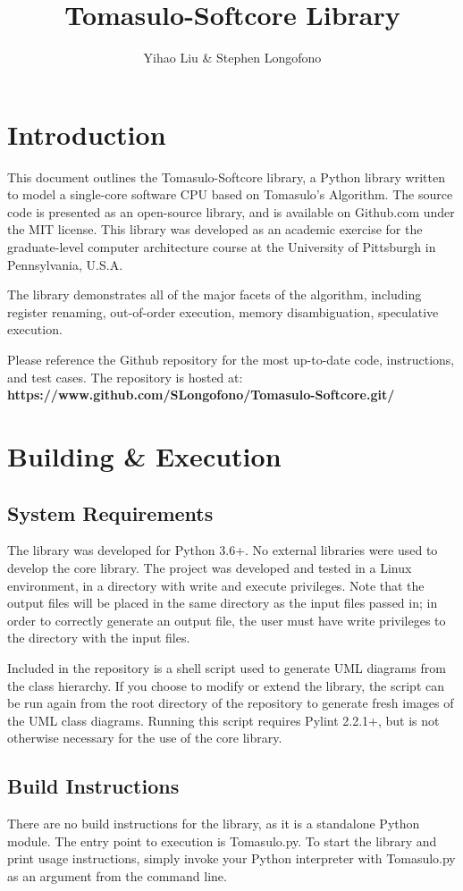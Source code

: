 \documentclass[12pt]{article}
\title{Tomasulo-Softcore Library}
\author{Yihao Liu \& Stephen Longofono}
\begin{document}
\maketitle
\section*{Introduction}
This document outlines the Tomasulo-Softcore library, a Python library written to model a single-core software CPU based on Tomasulo's Algorithm.  The source code is presented as an open-source library, and is available on Github.com under the MIT license.  This library was developed as an academic exercise for the graduate-level computer architecture course at the University of Pittsburgh in Pennsylvania, U.S.A.

The library demonstrates all of the major facets of the algorithm, including register renaming, out-of-order execution, memory disambiguation, speculative execution.

Please reference the Github repository for the most up-to-date code, instructions, and test cases.  The repository is hosted at: \\
\textbf{https://www.github.com/SLongofono/Tomasulo-Softcore.git/}

\section{Building \& Execution}
\subsection{System Requirements}
The library was developed for Python 3.6+.  No external libraries were used to develop the core library.  The project was developed and tested in a Linux environment, in a directory with write and execute privileges.  Note that the output files will be placed in the same directory as the input files passed in; in order to correctly generate an output file, the user must have write privileges to the directory with the input files.

Included in the repository is a shell script used to generate UML diagrams from the class hierarchy.  If you choose to modify or extend the library, the script can be run again from the root directory of the repository to generate fresh images of the UML class diagrams.  Running this script requires Pylint 2.2.1+, but is not otherwise necessary for the use of the core library.

\subsection{Build Instructions}
There are no build instructions for the library, as it is a standalone Python module.  The entry point to execution is Tomasulo.py.  To start the library and print usage instructions, simply invoke your Python interpreter with Tomasulo.py as an argument from the command line.
\end{document}
